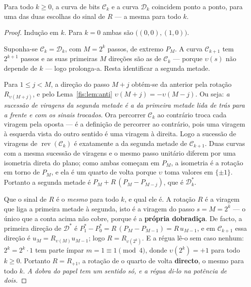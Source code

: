\documentclass[livro.tex]{subfiles}
\begin{document}
\begin{teorema}\label{fis:thm:dragao}
Para todo $k\ge0$, a curva de bits $\mathcal{C}_k$ e a curva $\mathcal{D}_k$
coincidem ponto a ponto, para uma das duas escolhas do sinal de $R$ --- a mesma
para todo $k$.
\end{teorema}

\begin{proof}
Indução em $k$. Para $k=0$ ambas são $\bigl((0,0),(1,0)\bigr)$.

Suponha-se $\mathcal{C}_k=\mathcal{D}_k$, com $M=2^{k}$ passos, de extremo $P_M$.
A curva $\mathcal{C}_{k+1}$ tem $2^{k+1}$ passos e as suas primeiras $M$ direções
são as de $\mathcal{C}_k$ --- porque $\upsilon(s)$ não depende de $k$ --- logo
prolonga-a. Resta identificar a segunda metade.

Para $1\le j<M$, a direção do passo $M+j$ obtém-se da anterior pela rotação
$R_{\upsilon(M+j)}$, e pelo Lema~\ref{fis:lem:anti}
$\upsilon(M+j)=-\upsilon(M-j)$. Ou seja: \emph{a sucessão de viragens da segunda
metade é a da primeira metade lida de trás para a frente e com os sinais
trocados}. Ora percorrer $\mathcal{C}_k$ ao contrário troca cada viragem pela
oposta --- é a definição de percorrer ao contrário, pois uma viragem à esquerda
vista do outro sentido é uma viragem à direita. Logo a sucessão de viragens de
$\operatorname{rev}(\mathcal{C}_k)$ é exatamente a da segunda metade de
$\mathcal{C}_{k+1}$. Duas curvas com a mesma sucessão de viragens e o mesmo passo
unitário diferem por uma isometria direta do plano; como ambas começam em $P_M$,
a isometria é a rotação em torno de $P_M$, e ela é um quarto de volta porque
$\upsilon$ toma valores em $\{\pm1\}$. Portanto a segunda metade é
$P_M+R\,(P_M-P_{M-j})$, que é $\mathcal{D}_k^{*}$.

Que o sinal de $R$ é o \emph{mesmo} para todo $k$, e qual ele é. A rotação $R$ é
a viragem que liga a primeira metade à segunda, isto é a viragem do passo
$s=M=2^{k}$ --- o único que a conta acima não cobre, porque é a \textbf{própria
dobradiça}. De facto, a primeira direção de $\mathcal{D}^{*}$ é
$P^{*}_1-P^{*}_0=R\,(P_M-P_{M-1})=R\,u_{M-1}$, e em $\mathcal{C}_{k+1}$ essa
direção é $u_M=R_{\upsilon(M)}u_{M-1}$; logo $R=R_{\upsilon(2^{k})}$. E a régua
lê-o sem caso nenhum: $2^{k}=2^{k}\cdot1$ tem parte ímpar $m=1\equiv1\pmod4$,
donde $\upsilon(2^{k})=+1$ para todo $k\ge0$. Portanto $R=R_{+1}$, a rotação de
o quarto de volta \textbf{directo}, o mesmo para todo $k$. \emph{A dobra do papel tem um sentido só, e
a régua di-lo na potência de dois.}\end{proof}
\end{document}
